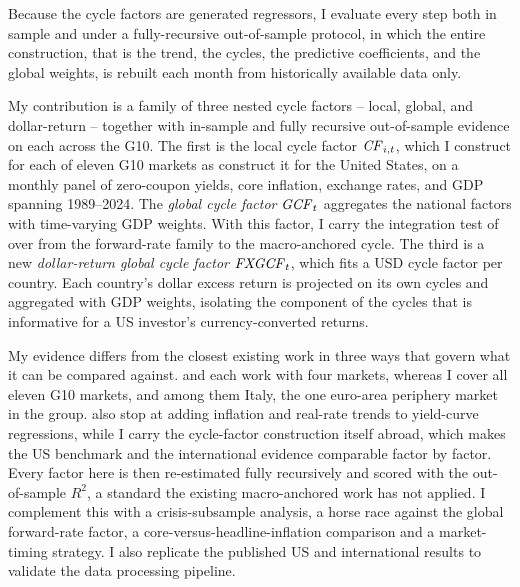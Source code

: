 Because the cycle factors are generated regressors, I evaluate every step
both in sample and under a fully-recursive out-of-sample protocol, in which
the entire construction, that is the trend, the cycles, the predictive
coefficients, and the global weights, is rebuilt each month from historically
available data only.


My contribution is a family of three nested cycle factors -- local, global, and
dollar-return -- together with in-sample and fully recursive out-of-sample
evidence on each across the G10. The first is the local cycle factor
$\mathit{CF}_{i,t}$, which I construct for each of eleven G10 markets as
\citet{cieslak2015} construct it for the United States, on a monthly panel
of zero-coupon yields, core inflation, exchange rates, and GDP spanning
1989--2024. The \emph{global
cycle factor} $\mathit{GCF}_{t}$ aggregates the national factors with time-varying
GDP weights. With this factor, I carry the integration test of
\citet{dahlquist2013} over from the forward-rate family to the macro-anchored
cycle. The third is a new \emph{dollar-return global
cycle factor} $\mathit{FXGCF}_{t}$, which fits a USD cycle factor per country. Each
country's dollar excess return is projected on its own cycles and
aggregated with GDP weights, isolating the component of the
cycles that is informative for a US investor's currency-converted returns.

My evidence differs from the closest existing work in three ways that govern
what it can be compared against. \citet{dahlquist2013} and
\citet{zhang2021} each work with four markets, whereas I cover all eleven G10
markets, and among them Italy, the one euro-area periphery market in the
group. \citet{zhang2021} also stop at adding inflation and real-rate
trends to yield-curve regressions, while I carry the cycle-factor construction
itself abroad, which makes the US benchmark and the international evidence
comparable factor by factor. Every factor here is then
re-estimated fully recursively and scored with the out-of-sample $R^{2}$, a
standard the existing macro-anchored work has not applied. I complement this with a crisis-subsample
analysis, a horse race against the global forward-rate factor, a
core-versus-headline-inflation comparison and a market-timing strategy.
I also
replicate the published US and international results to validate the data
processing pipeline.


